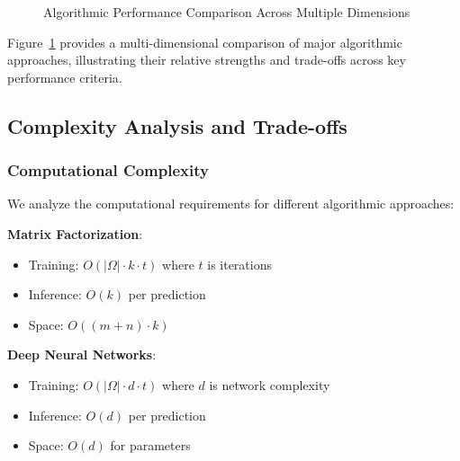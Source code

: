 \begin{figure}[ht]
\caption{Algorithmic Performance Comparison Across Multiple Dimensions}
\label{fig:algorithm_performance}
\end{figure}

Figure~\ref{fig:algorithm_performance} provides a multi-dimensional comparison of major algorithmic approaches, illustrating their relative strengths and trade-offs across key performance criteria.

\subsection{Complexity Analysis and Trade-offs}

\subsubsection{Computational Complexity}
We analyze the computational requirements for different algorithmic approaches:

\textbf{Matrix Factorization}:
\begin{itemize}
    \item Training: $O(|\Omega| \cdot k \cdot t)$ where $t$ is iterations
    \item Inference: $O(k)$ per prediction
    \item Space: $O((m+n) \cdot k)$
\end{itemize}

\textbf{Deep Neural Networks}:
\begin{itemize}
    \item Training: $O(|\Omega| \cdot d \cdot t)$ where $d$ is network complexity
    \item Inference: $O(d)$ per prediction
    \item Space: $O(d)$ for parameters
\end{itemize}

